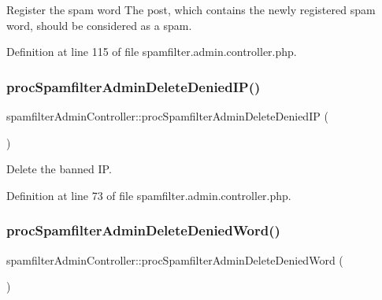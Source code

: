 Register the spam word The post, which contains the newly registered spam word, should be considered as a spam. 



Definition at line 115 of file spamfilter.\+admin.\+controller.\+php.

\hypertarget{classspamfilterAdminController_a720e0592f60455d125b55ee797de2436}{}\label{classspamfilterAdminController_a720e0592f60455d125b55ee797de2436} 
\subsubsection{\texorpdfstring{proc\+Spamfilter\+Admin\+Delete\+Denied\+I\+P()}{procSpamfilterAdminDeleteDeniedIP()}}
{\footnotesize\ttfamily spamfilter\+Admin\+Controller\+::proc\+Spamfilter\+Admin\+Delete\+Denied\+IP (\begin{DoxyParamCaption}{ }\end{DoxyParamCaption})}



Delete the banned IP. 



Definition at line 73 of file spamfilter.\+admin.\+controller.\+php.

\hypertarget{classspamfilterAdminController_aeb21ee58872bf61875be7e0fffabcf3a}{}\label{classspamfilterAdminController_aeb21ee58872bf61875be7e0fffabcf3a} 
\subsubsection{\texorpdfstring{proc\+Spamfilter\+Admin\+Delete\+Denied\+Word()}{procSpamfilterAdminDeleteDeniedWord()}}
{\footnotesize\ttfamily spamfilter\+Admin\+Controller\+::proc\+Spamfilter\+Admin\+Delete\+Denied\+Word (\begin{DoxyParamCaption}{ }\end{DoxyParamCaption})}



